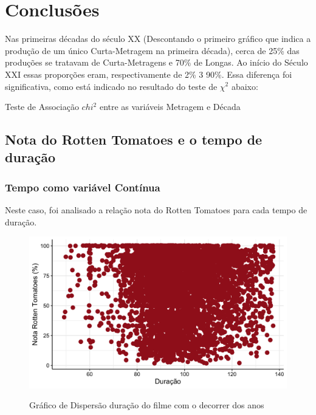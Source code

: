 \documentclass[a4paper, 12pt]{article} %
\begin{document}
\section{Conclusões}

Nas primeiras décadas do século XX (Descontando o primeiro gráfico que indica a produção de um único Curta-Metragem na primeira década), cerca de 25\% das produções se tratavam de Curta-Metragens e 70\% de Longas. Ao início do Século XXI essas proporções eram, respectivamente de 2\% 3 90\%. Essa diferença foi significativa, como está indicado no resultado do teste de $\chi^2$ abaixo:

\begin{quadro}[H]
\centering
\caption{Teste de Associação $chi^2$ entre as variáveis Metragem e Década }
\label{R-Q-Teste-1}
\vspace{0.1cm}
\end{quadro}

\subsection{Nota do Rotten Tomatoes e o tempo de duração}

\subsubsection{Tempo como variável Contínua}

Neste caso, foi analisado a relação nota  do Rotten Tomatoes para cada tempo de duração. 
 
\begin{figure}[H]
    \centering
    \caption{Gráfico de Dispersão duração do filme com o decorrer dos anos}
    \includegraphics[scale=0.15]{Fig_Rotten_Duracao.png}
    \label{fig:my_label}
\end{figure}
\end{document}
